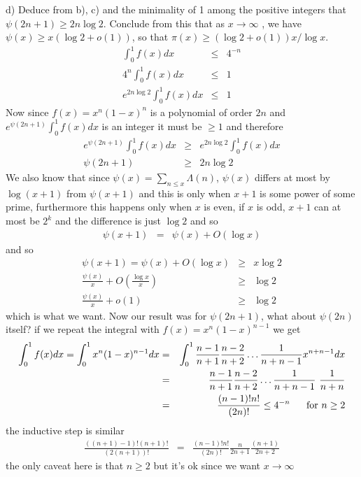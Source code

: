 \documentclass[aps,preprint,preprintnumbers,nofootinbib,showpacs,prd]{revtex4-1}
\newcommand{\nbea}{\begin{eqnarray*}}
\newcommand{\neea}{\end{eqnarray*}}
\begin{document}
d) Deduce from b), c) and the minimality of 1 among the positive integers that $\psi(2n + 1) \ge 2n \log 2$. Conclude from this that as $x \to \infty$ , we have $\psi(x) \ge x(\log 2 + o(1))$, so that $\pi(x) \ge (\log 2 + o(1))x/ \log x$.
%
\nbea
\int^1_0 f(x) dx & \le & 4^{-n} \\
4^{n} \int^1_0 f(x) dx & \le & 1 \\
e^{2n \log 2} \int^1_0 f(x) dx & \le & 1
\neea
%
Now since $f(x) = x^n(1-x)^n$ is a polynomial of order $2n$ and $e^{\psi(2n+1)}\int_0^1 f(x) dx$ is an integer it must be $\ge 1$ and therefore
%
\nbea
e^{\psi(2n+1)}\int_0^1 f(x) dx & \ge & e^{2n \log 2} \int^1_0 f(x) dx \\
\psi(2n+1) & \ge & 2n \log 2
\neea
%
We also know that since $\psi(x) = \sum_{n\le x} \Lambda(n)$, $\psi(x)$ differs at most by $\log (x + 1)$ from $\psi(x+1)$ and this is only when $x + 1$ is some power of some prime, furthermore this happens only when $x$ is even, if $x$ is odd, $x+1$ can at most be $2^k$ and the difference is just $\log 2$ and so
%
\nbea
\psi(x+1) & = & \psi(x) + O(\log x)
\neea
%
and so
%
\nbea
\psi(x+1) = \psi(x) + O(\log x) & \ge & x \log 2 \\
\frac{\psi(x)}{x} + O \left ( \frac{\log x}{x} \right ) & \ge & \log 2 \\
\frac{\psi(x)}{x} + o(1) & \ge & \log 2
\neea
%
which is what we want. Now our result was for $\psi(2n+1)$, what about $\psi(2n)$ itself? if we repeat the integral with $f(x) = x^n(1-x)^{n-1}$ we get
%
\nbea
\int^1_0 f(x) dx = \int_0^1 x^n(1-x)^{n-1} dx & = & \int_0^1 \frac{n-1}{n+1} \frac{n-2}{n+2} \dots \frac{1}{n + n - 1} x^{n+n - 1} dx \\
& = & \frac{n-1}{n+1} \frac{n-2}{n+2} \dots \frac{1}{n + n - 1} ~ \frac{1}{n + n} \\
& = & \frac{(n-1)!n!}{(2n)!} \le 4^{-n} ~~~~~ {\rm for~} n \ge 2
\neea
%
the inductive step is similar
%
\nbea
\frac{((n+1)-1)!(n+1)!}{(2(n+1))!} & = & \frac{(n-1)!n!}{(2n)!} \frac{n}{2n+1} \frac{(n+1)}{2n+2}
\neea
%
the only caveat here is that $n \ge 2$ but it's ok since we want $x \to \infty$
\end{document}
